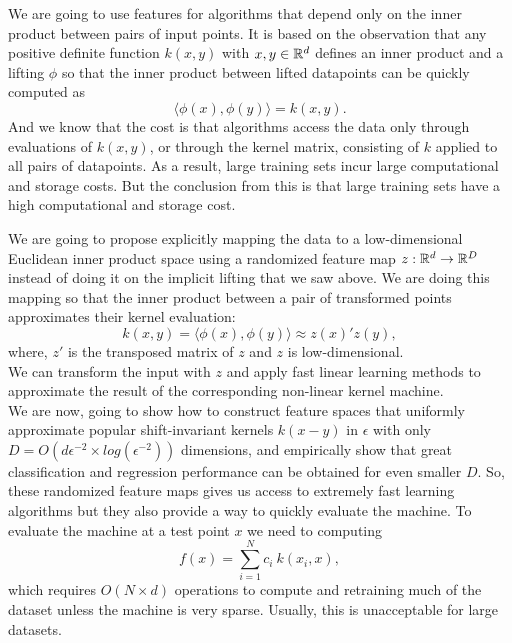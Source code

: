\documentclass{article}
\begin{document}
We are going to use features for algorithms that depend only on the inner product between pairs of input points. It is based on  the observation that any positive definite function $k(x,y)$ with $x,y\in \mathbb{R}^d$ defines an inner product and a lifting $\phi$ so that the inner product between lifted datapoints can be quickly computed as
\begin{equation*}
    \langle \phi(x), \phi(y)\rangle = k(x,y).
\end{equation*}
And we know that the cost is that algorithms access the data only through evaluations of $k(x,y)$, or through the kernel matrix,  consisting of $k$ applied to all pairs of datapoints. As a result, large training sets incur large computational and storage costs. But the conclusion from this is that large training sets have a high computational and storage cost.

We are going to propose explicitly mapping the data to a low-dimensional Euclidean inner product space using a randomized feature map $z: \mathbb{R}^d \rightarrow \mathbb{R}^D$ instead of doing it on the implicit lifting that we saw above.
\newpage
We are doing this mapping so that the inner product between a pair of transformed points approximates their kernel evaluation:
\begin{equation*}
    k(x, y) = \langle \phi(x), \phi(y) \rangle \approx z(x)' z(y),
\end{equation*}
where, $z'$ is the transposed matrix of $z$ and $z$ is low-dimensional. \\
We can transform the input with $z$ and apply fast linear learning methods to approximate the result of the corresponding non-linear kernel machine. \\

We are now, going to show how to construct feature spaces that uniformly approximate popular shift-invariant kernels $k(x-y)$ in $\epsilon$ with only $D = O(d \epsilon^{-2} \times log (\epsilon^{-2}))$ dimensions, and empirically show that great classification and regression performance can be obtained for even smaller $D$. 
So, these randomized feature maps gives us access to extremely fast learning algorithms but they also provide a way to quickly evaluate the machine. To evaluate the machine at a test point $x$ we need to computing
\begin{equation*}
    f(x) = \sum_{i=1}^N c_i \ k(x_i, x),
\end{equation*}
which requires $O(N\times d)$ operations to compute and retraining much of the dataset unless the machine is very sparse. Usually, this is unacceptable for large datasets. \\
\end{document}
